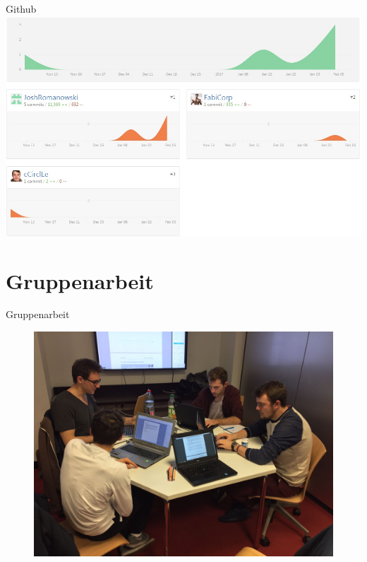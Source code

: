 \documentclass[19pt]{beamer}
\begin{document}
\begin{frame}{Github}
\includegraphics[scale=0.15]{resources/GithubImp.jpg}
\end{frame}

\section{Gruppenarbeit}
\begin{frame}{Gruppenarbeit}
	\begin{figure}
		\begin{center}
			\includegraphics[scale=0.16]{resources/Gruppenarbeit} 
		\end{center}
	\end{figure}	 
\end{frame}
\end{document}
